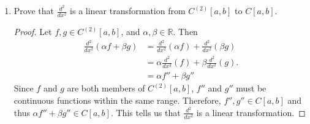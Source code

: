 \documentclass{article}
\begin{document}
\begin{enumerate}
\begin{enumerate}
\begin{proof}
\[                              \]
                              We know that
                              \begin{align*}
                                    \lVert f_m-f_n\rVert & = \lVert f_m - f_n\rVert_\infty + \lVert f_m' - f_n'\rVert_\infty + \lVert f_m'' - f_n''\rVert_\infty                                                  \\
                                                         & \geq \lVert f_m\rVert_\infty - \lVert f_n\rVert_\infty + f_m'\rVert_\infty - \lVert f_n'\rVert_\infty + f_m''\rVert_\infty - \lVert f_n''\rVert_\infty \\
                                                         & = \lVert f_m\rVert - \lVert f_n\rVert
                              \end{align*}
                              So it follows that
                              \[
                                    \lVert f_m\rVert - \lVert f_n\rVert \leq \lVert f_m-f_n\rVert < \varepsilon
                                    \implies \lVert f_m\rVert - \lVert f_n\rVert< \varepsilon.
                              \]
                              Thus, $\{f_n\}$ converges to a real number.
                        \end{proof}
                  \item Prove that $\frac{d^2}{dx^2}$ is a linear
                        transformation from $C^{(2)}[a,b]$ to $C[a,b]$.
                        \begin{proof}
                              Let $f, g\in C^{(2)}[a,b]$, and $\alpha, \beta\in\mathbb{R}$. Then
                              \begin{align*}
                                    \frac{d^2}{dx^2}(\alpha f+\beta g) & = \frac{d^2}{dx^2}(\alpha f) + \frac{d^2}{dx^2}(\beta g) \\
                                                                       & = \alpha\frac{d^2}{dx^2}(f) + \beta\frac{d^2}{dx^2}(g).  \\
                                                                       & = \alpha f'' + \beta g''
                              \end{align*}
                              Since $f$ and $g$ are both members of $C^{(2)}[a,b]$, $f''$ and
                              $g''$ must be continuous functions within the same range. Therefore,
                              $f'',g''\in C[a,b]$ and thus $\alpha f'' + \beta g''\in C[a,b]$.
                              This tells us that $\frac{d^2}{dx^2}$ is a linear transformation.

\end{proof}
\end{enumerate}
\end{enumerate}
\end{document}
